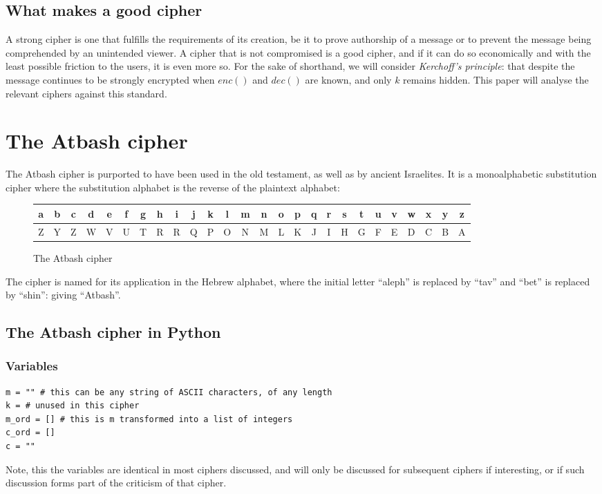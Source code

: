 \documentclass{AIAA}
\begin{document}
\subsection{What makes a good cipher}

A strong cipher is one that fulfills the requirements of its creation, be it to prove authorship of a message or to prevent the message being comprehended by an unintended viewer. A cipher that is not compromised is a good cipher, and if it can do so economically and with the least possible friction to the users, it is even more so. For the sake of shorthand, we will consider \textit{Kerchoff's principle}: that despite the message continues to be strongly encrypted when $enc()$ and $dec()$ are known, and only $k$ remains hidden. This paper will analyse the relevant ciphers against this standard.

\section{The Atbash cipher}
The Atbash cipher is purported to have been used in the old testament, as well as by ancient Israelites. It is a monoalphabetic substitution cipher where the substitution alphabet is the reverse of the plaintext alphabet:

\begin{figure}[h!]
\begin{tabular}{|c|c|c|c|c|c|c|c|c|c|c|c|c|c|c|c|c|c|c|c|c|c|c|c|c|c|}
\hline
a & b & c & d & e & f & g & h & i & j & k & l & m & n & o & p & q & r & s & t & u & v & w & x & y & z \\ \hline
Z & Y & Z & W & V & U & T & R & R & Q & P & O & N & M & L & K & J & I & H & G & F & E & D & C & B & A \\
\hline
\end{tabular}
\caption{The Atbash cipher}
\end{figure}

The cipher is named for its application in the Hebrew alphabet, where the initial letter ``aleph'' is replaced by ``tav'' and ``bet'' is replaced by ``shin'': giving ``Atbash''. 

\subsection{The Atbash cipher in Python}

\subsubsection{Variables}
\begin{verbatim}
m = "" # this can be any string of ASCII characters, of any length
k = # unused in this cipher
m_ord = [] # this is m transformed into a list of integers
c_ord = []
c = ""
\end{verbatim}
Note, this the variables are identical in most ciphers discussed, and will only be discussed for subsequent ciphers if interesting, or if such discussion forms part of the criticism of that cipher.
\end{document}
